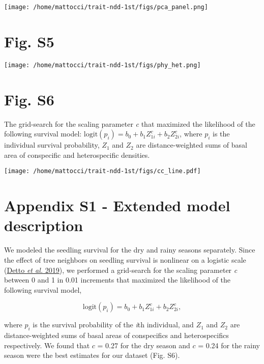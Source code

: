 \documentclass[
  12pt,
  letterpaper,
  DIV=11,
  numbers=noendperiod]{scrartcl}
\begin{document}
\texttt{[image: /home/mattocci/trait-ndd-1st/figs/pca\_panel.png]}

\newpage

\hypertarget{fig.-s5}{%
\section{Fig. S5}\label{fig.-s5}}

\texttt{[image: /home/mattocci/trait-ndd-1st/figs/phy\_het.png]}

\newpage

\hypertarget{fig.-s6}{%
\section{Fig. S6}\label{fig.-s6}}

The grid-search for the scaling parameter \emph{c} that maximized the
likelihood of the following survival model:
\(\mathrm{logit}(p_i) = b_0 + b_1 Z_{1i}^c + b_2 Z_{2i}^c\), where
\(p_i\) is the individual survival probability, \(Z_1\) and \(Z_2\) are
distance-weighted sums of basal area of conspecific and heterospecific
densities.

\texttt{[image: /home/mattocci/trait-ndd-1st/figs/cc\_line.pdf]}

\newpage

\hypertarget{appendix-s1---extended-model-description}{%
\section{Appendix S1 - Extended model
description}\label{appendix-s1---extended-model-description}}

We modeled the seedling survival for the dry and rainy seasons
separately. Since the effect of tree neighbors on seedling survival is
nonlinear on a logistic scale (\protect\hyperlink{ref-Detto2019}{Detto
\emph{et al.} 2019}), we performed a grid-search for the scaling
parameter \emph{c} between 0 and 1 in 0.01 increments that maximized the
likelihood of the following survival model,

\[
\mathrm{logit}(p_i) = b_0 + b_1 Z_{1i}^c + b_2 Z_{2i}^c,
\]

where \(p_i\) is the survival probability of the \emph{i}th individual,
and \(Z_1\) and \(Z_2\) are distance-weighted sums of basal areas of
conspecifics and heterospecifics respectively. We found that \(c\) =
0.27 for the dry season and \(c\) = 0.24 for the rainy season were the
best estimates for our dataset (Fig. S6).
\end{document}

